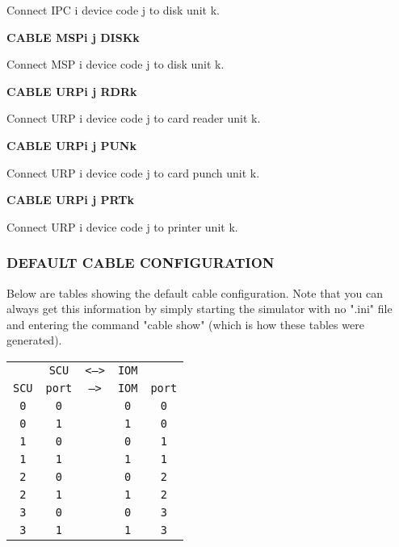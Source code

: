 \begin{adjustwidth}{5ex}{1ex}
  Connect IPC i device code j to disk unit k.
\end{adjustwidth}  

\textbf{CABLE MSPi j DISKk}

\begin{adjustwidth}{5ex}{1ex}
  Connect MSP i device code j to disk unit k.
\end{adjustwidth}  

\textbf{CABLE URPi j RDRk}

\begin{adjustwidth}{5ex}{1ex}
  Connect URP i device code j to card reader unit k.
\end{adjustwidth}  

\textbf{CABLE URPi j PUNk}

\begin{adjustwidth}{5ex}{1ex}
  Connect URP i device code j to card punch unit k.
\end{adjustwidth}  

\textbf{CABLE URPi j PRTk}

\begin{adjustwidth}{5ex}{1ex}
  Connect URP i device code j to printer unit k.
\end{adjustwidth}  

\subsubsection[Default Cable Configuration]{DEFAULT CABLE CONFIGURATION}

Below are tables showing the default cable configuration. Note that you
can always get this information by simply starting the simulator with
no ".ini" file and entering the command "cable show" (which is how these tables were generated).

\begin{adjustwidth}{5ex}{1ex}
	\begin{tabular}{ccccc}
		& \texttt{SCU} & \texttt{<-->} & \texttt{IOM} &  \\
		\texttt{SCU} & \texttt{port} & \texttt{-->} & \texttt{IOM} & \texttt{port} \\
		\texttt{0} & \texttt{0} & & \texttt{0} & \texttt{0} \\
		\texttt{0} & \texttt{1} & & \texttt{1} & \texttt{0} \\
		\texttt{1} & \texttt{0} & & \texttt{0} & \texttt{1} \\
		\texttt{1} & \texttt{1} & & \texttt{1} & \texttt{1} \\
		\texttt{2} & \texttt{0} & & \texttt{0} & \texttt{2} \\
		\texttt{2} & \texttt{1} & & \texttt{1} & \texttt{2} \\
		\texttt{3} & \texttt{0} & & \texttt{0} & \texttt{3} \\
		\texttt{3} & \texttt{1} & & \texttt{1} & \texttt{3} \\
	\end{tabular}
\end{adjustwidth}

